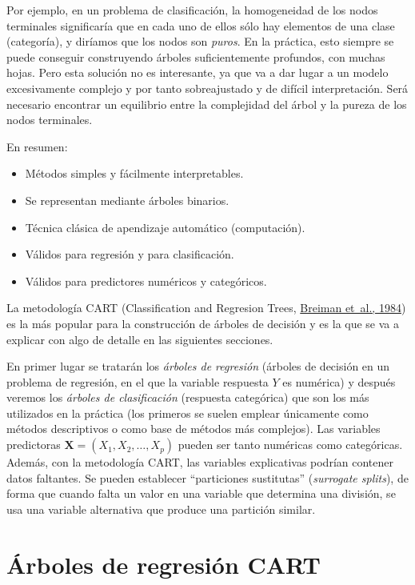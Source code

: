 \documentclass[
]{book}
\theoremstyle{break}
\theoremstyle{nonumberplain}
\begin{document}
Por ejemplo, en un problema de clasificación, la homogeneidad de los nodos terminales significaría que en cada uno de ellos sólo hay elementos de una clase (categoría), y diríamos que los nodos son \emph{puros}.
En la práctica, esto siempre se puede conseguir construyendo árboles suficientemente profundos, con muchas hojas.
Pero esta solución no es interesante, ya que va a dar lugar a un modelo excesivamente complejo y por tanto sobreajustado y de difícil interpretación.
Será necesario encontrar un equilibrio entre la complejidad del árbol y la pureza de los nodos terminales.

En resumen:

\begin{itemize}
\item
  Métodos simples y fácilmente interpretables.
\item
  Se representan mediante árboles binarios.
\item
  Técnica clásica de apendizaje automático (computación).
\item
  Válidos para regresión y para clasificación.
\item
  Válidos para predictores numéricos y categóricos.
\end{itemize}

La metodología CART (Classification and Regresion Trees, \protect\hyperlink{ref-breiman1984classification}{Breiman et~al., 1984}) es la más popular para la construcción de árboles de decisión y es la que se va a explicar con algo de detalle en las siguientes secciones.

En primer lugar se tratarán los \emph{árboles de regresión} (árboles de decisión en un problema de regresión, en el que la variable respuesta \(Y\) es numérica) y después veremos los \emph{árboles de clasificación} (respuesta categórica) que son los más utilizados en la práctica (los primeros se suelen emplear únicamente como métodos descriptivos o como base de métodos más complejos).
Las variables predictoras \(\mathbf{X}=(X_1, X_2, \ldots, X_p)\) pueden ser tanto numéricas como categóricas.
Además, con la metodología CART, las variables explicativas podrían contener datos faltantes.
Se pueden establecer ``particiones sustitutas'' (\emph{surrogate splits}), de forma que cuando falta un valor en una variable que determina una división, se usa una variable alternativa que produce una partición similar.

\hypertarget{uxe1rboles-de-regresiuxf3n-cart}{%
\section{Árboles de regresión CART}\label{uxe1rboles-de-regresiuxf3n-cart}}
\end{document}
